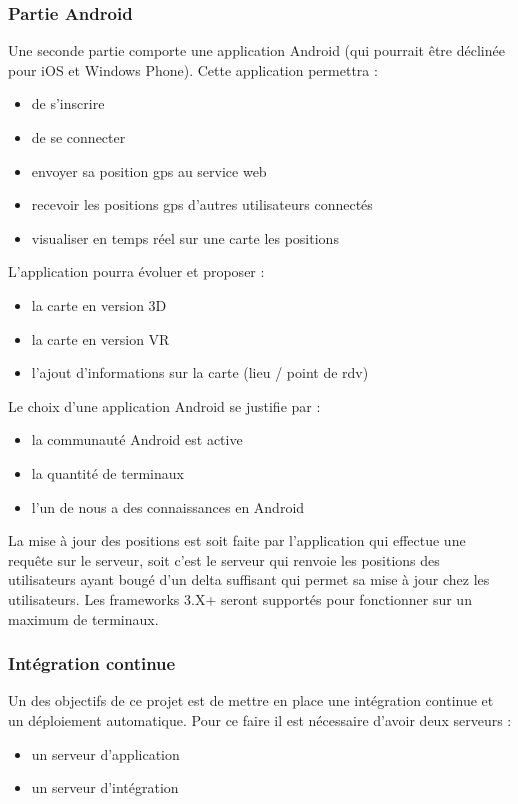 \subsubsection{Partie Android}
Une seconde partie comporte une application Android (qui pourrait être déclinée pour iOS et Windows Phone). Cette application permettra :
\begin{itemize}
    \item de s'inscrire
    \item de se connecter
    \item envoyer sa position gps au service web
    \item recevoir les positions gps d'autres utilisateurs connectés
    \item visualiser en temps réel sur une carte les positions
\end{itemize}

L'application pourra évoluer et proposer :
\begin{itemize}
    \item la carte en version 3D
    \item la carte en version VR
    \item l'ajout d'informations sur la carte (lieu / point de rdv)
\end{itemize}

Le choix d'une application Android se justifie par :
\begin{itemize}
    \item la communauté Android est active
    \item la quantité de terminaux
    \item l'un de nous a des connaissances en Android
\end{itemize}
La mise à jour des positions est soit faite par l'application qui effectue une requête sur le serveur, soit c'est le serveur qui renvoie les positions des utilisateurs ayant bougé d'un delta suffisant qui permet sa mise à jour chez les utilisateurs. Les frameworks 3.X+ seront supportés pour fonctionner sur un maximum de terminaux.


\subsubsection{Intégration continue}
Un des objectifs de ce projet est de mettre en place une intégration continue et un déploiement automatique. Pour ce faire il est nécessaire d'avoir deux serveurs :
\begin{itemize}
    \item un serveur d'application
    \item un serveur d'intégration
\end{itemize}


